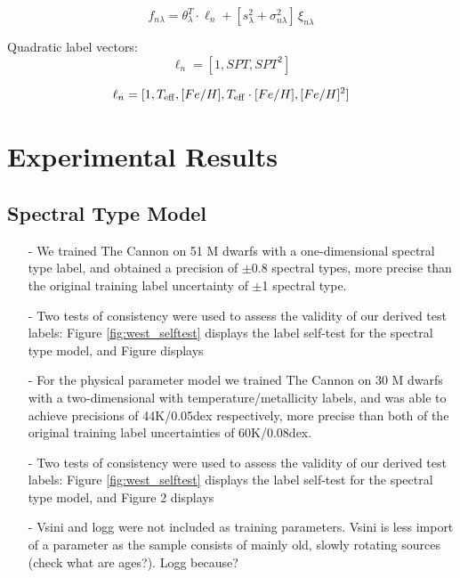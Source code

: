 \documentclass[modern]{aastex62}
\begin{document}
\begin{equation}
	f_{n\lambda} = \theta_{\lambda}^{T} \cdot \ell_{n} + [s_{\lambda}^{2} + \sigma_{n\lambda}^{2}] \,\xi_{n\lambda}
\end{equation}

Quadratic label vectors:
\begin{equation}
	\ell_{n} = [1, SPT, SPT^{2}]
\end{equation}

\begin{equation}
	\ell_{n} = [1, T_{\rm eff}, [Fe/H], T_{\rm eff} \cdot [Fe/H], [Fe/H]^{2}]
\end{equation}


\section{Experimental Results} \label{sec:results}

\subsection{Spectral Type Model}

\begin{enumerate}
\item[-] We trained The Cannon on 51 M dwarfs with a one-dimensional spectral type label, and obtained a precision of $\pm$0.8 spectral types, more precise than the original training label uncertainty of $\pm$1 spectral type.
\item[-] Two tests of consistency were used to assess the validity of our derived test labels: Figure \ref{fig:west_selftest} displays the label self-test for the spectral type model, and Figure  displays 
\end{enumerate}


\begin{enumerate}
\item[-] For the physical parameter model we trained The Cannon on 30 M dwarfs with a two-dimensional with temperature/metallicity labels, and was able to achieve precisions of 44K/0.05dex respectively, more precise than both of the original training label uncertainties of 60K/0.08dex.

\item[-] Two tests of consistency were used to assess the validity of our derived test labels: Figure \ref{fig:west_selftest} displays the label self-test for the spectral type model, and Figure 2 displays 

\item[-] Vsini and logg were not included as training parameters. Vsini is less import of a parameter as the sample consists of mainly old, slowly rotating sources (check what are ages?). Logg because?
\end{enumerate}
\end{document}
